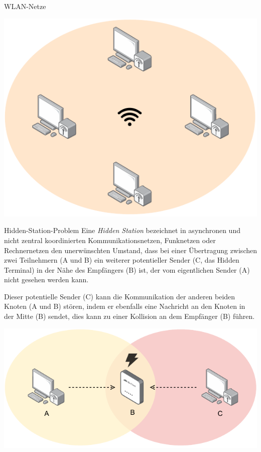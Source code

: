 \begin{defi}{WLAN-Netze}
\begin{itemize}
\begin{itemize}
              \end{itemize}
              \begin{center}
                  \vspace{1em}
                  \includegraphics[width=.3\textwidth]{includes/figures/defi_adhoc.pdf}
              \end{center}
    \end{itemize}
\end{defi}

\begin{defi}{Hidden-Station-Problem}
    Eine \emph{Hidden Station} bezeichnet in asynchronen und nicht zentral koordinierten Kommunikationsnetzen, Funknetzen oder Rechnernetzen den unerwünschten Umstand, dass bei einer Übertragung zwischen zwei Teilnehmern (A und B) ein weiterer potentieller Sender (C, das Hidden Terminal) in der Nähe des Empfängers (B) ist, der vom eigentlichen Sender (A) nicht gesehen werden kann.

    Dieser potentielle Sender (C) kann die Kommunikation der anderen beiden Knoten (A und B) stören, indem er ebenfalls eine Nachricht an den Knoten in der Mitte (B) sendet, dies kann zu einer Kollision an dem Empfänger (B) führen.

    \centering
    \includegraphics[width=.5\textwidth]{includes/figures/defi_hidden_station.pdf}
\end{defi}

